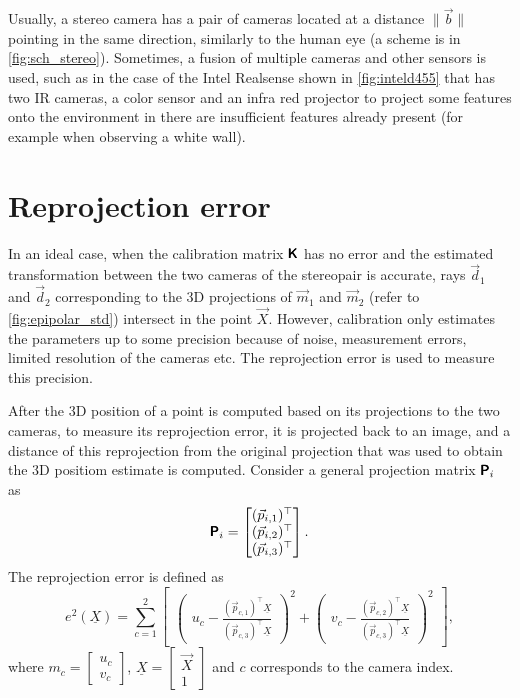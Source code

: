 Usually, a stereo camera has a pair of cameras located at a distance $\lVert \vec{b} \rVert$ pointing in the same direction, similarly to the human eye (a scheme is in \autoref{fig:sch_stereo}).
Sometimes, a fusion of multiple cameras and other sensors is used, such as in the case of the Intel Realsense shown in \autoref{fig:inteld455} that has two IR cameras, a color sensor and an infra red projector to project some features onto the environment in there are insufficient features already present (for example when observing a white wall).

\section{Reprojection error}
\label{sec:error_reprojection}
In an ideal case, when the calibration matrix $\pmb{\mathsf{K}}$ has no error and the estimated transformation between the two cameras of the stereopair is accurate, rays $\vec{d}_1$ and $\vec{d}_2$ corresponding to the 3D projections of $\vec{m}_1$ and $\vec{m}_2$ (refer to \autoref{fig:epipolar_std}) intersect in the point $\vec{X}$. 
However, calibration only estimates the parameters up to some precision because of noise, measurement errors, limited resolution of the cameras etc.
The reprojection error is used to measure this precision.

After the 3D position of a point is computed based on its projections to the two cameras, to measure its reprojection error, it is projected back to an image, and a distance of this reprojection from the original projection that was used to obtain the 3D positiom estimate is computed.
Consider a general projection matrix $\pmb{\mathsf{P}}_i$ as
\begin{equation}
    \label{eq:p_general}
    \pmb{\mathsf{P}}_i = \begin{bmatrix} 
        (\vec{p}_{i, 1})^\top \\ 
        (\vec{p}_{i, 2})^\top \\ 
        (\vec{p}_{i, 3})^\top \end{bmatrix}.
\end{equation}
The reprojection error is defined as 
\begin{equation}
    e^2(\underline{X}) = \sum_{c=1}^{2}{  
    \begin{bmatrix}
        \begin{pmatrix}
            u_c - \frac{(\vec{p}_{c, 1})^\top \underline{X}}{(\vec{p}_{c, 3})^\top \underline{X}}
        \end{pmatrix}^2 + 
        \begin{pmatrix}
            v_c - \frac{(\vec{p}_{c, 2})^\top \underline{X}}{(\vec{p}_{c, 3})^\top \underline{X}}
        \end{pmatrix}^2
    \end{bmatrix}
    },
\end{equation}
where $m_c = \begin{bmatrix} u_c \\ v_c \end{bmatrix}$, $\underline{X} = \begin{bmatrix} \vec{X} \\ 1 \end{bmatrix}$ and $c$ corresponds to the camera index.
